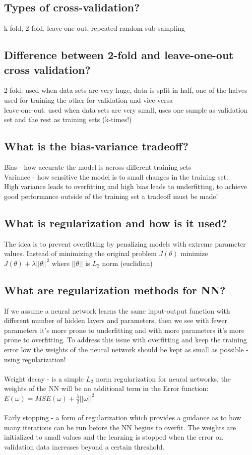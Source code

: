 \documentclass[12pt]{scrartcl}
\begin{document}
\subsection{Types of cross-validation?}
k-fold, 2-fold, leave-one-out, repeated random sub-sampling

\subsection{Difference between 2-fold and leave-one-out cross validation?}
2-fold: used when data sets are very huge, data is split in half, one of the halves used for training the other for validation and vice-versa \\
leave-one-out: used when data sets are very small, uses one sample as validation set and the rest as training sets (k-times!)

\subsection{What is the bias-variance tradeoff?}
Bias - how accurate the model is across different training sets \\
Variance - how sensitive the model is to small changes in the training set. \\
High variance leads to overfitting and high bias leads to underfitting, to achieve good performance outside of the training set a tradeoff must be made!

\subsection{What is regularization and how is it used?}
The idea is to prevent overfitting by penalizing models with extreme parameter values. Instead of minimizing the original problem $J(\theta)$ minimize $J(\theta) + \lambda ||\theta||^2$ where $||\theta||$ is $L_2$ norm (euclidian)

\subsection{What are regularization methods for NN?}
If we assume a neural network learns the same input-output function with different number of hidden layers and parameters, then we see with fewer parameters it's more prone to underfitting and with more parameters it's more prone to overfitting. To address this issue with overfitting and keep the training error low the weights of the neural network should be kept as small as possible - using regularization! \\ \\
Weight decay - is a simple $L_2$ norm regularization for neural networks, the weights of the NN will be an additional term in the Error function: \\ $E(\omega) = MSE(\omega) + \frac{\lambda}{2}||\omega||^2$ \\ \\
Early stopping - a form of regularization which provides a guidance as to how many iterations can be run before the NN begins to overfit. The weights are initialized to small values and the learning is stopped when the error on validation data increases beyond a certain threshold.
\end{document}
